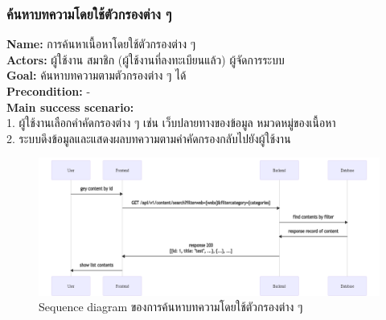 \documentclass[12pt,oneside,openright,a4paper]{cpe-thai-project}
\begin{document}
\subsubsection{ค้นหาบทความโดยใช้ตัวกรองต่าง ๆ}
\textbf{Name: }การค้นหาเนื้อหาโดยใช้ตัวกรองต่าง ๆ \\
\textbf{Actors: }ผู้ใช้งาน สมาชิก (ผู้ใช้งานที่ลงทะเบียนแล้ว) ผู้จัดการระบบ \\
\textbf{Goal: }ค้นหาบทความตามตัวกรองต่าง ๆ ได้ \\
\textbf{Precondition: }- \\
\textbf{Main success scenario: } \\
  \hspace*{0.5cm}1. ผู้ใช้งานเลือกคำคัดกรองต่าง ๆ เช่น เว็บปลายทางของข้อมูล หมวดหมู่ของเนื้อหา \\
  \hspace*{0.5cm}2. ระบบดึงข้อมูลและแสดงผลบทความตามคำคัดกรองกลับไปยังผู้ใช้งาน  \\ \newpage
\begin{figure}[!ht]\centering
  \includegraphics[width=\textwidth]{./img/seq_filter.png}
  \caption{Sequence diagram ของการค้นหาบทความโดยใช้ตัวกรองต่าง ๆ}\label{fig:seq_content_search} 
\end{figure} 
\end{document}
